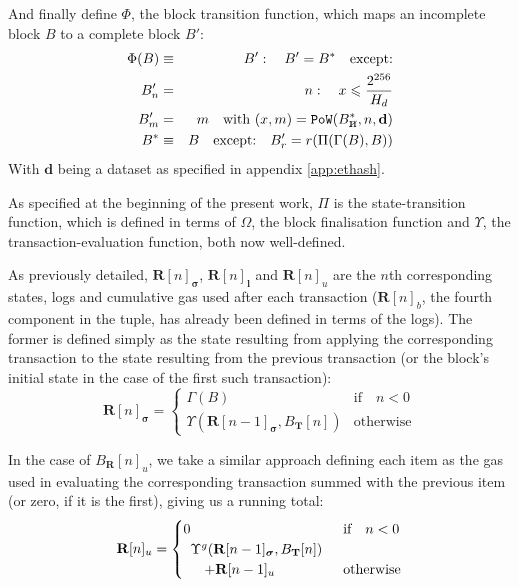 \documentclass[9pt,oneside]{amsart}
\newcommand{\hcancel}[1]{%
    \tikz[baseline=(tocancel.base)]{
        \node[inner sep=0pt,outer sep=0pt] (tocancel) {#1};
        \draw[black] (tocancel.south west) -- (tocancel.north east);
    }%
}%
\begin{document}
\begin{multicols}{2}
And finally define $\Phi$, the block transition function, which maps an incomplete block $B$ to a complete block $B'$:
\begin{eqnarray}
\Phi(B) & \equiv & B': \quad B' = B^* \quad \text{except:} \\
B'_n & = & n: \quad x \leqslant \frac{2^{256}}{H_d} \\
B'_m & = & m \quad \text{with } (x, m) = \mathtt{PoW}(B^*_{\hcancel{n}}, n, \mathbf{d}) \\
B^* & \equiv & B \quad \text{except:} \quad B'_r = r(\Pi(\Gamma(B), B))
\end{eqnarray}
With $\mathbf{d}$ being a dataset as specified in appendix \ref{app:ethash}.

As specified at the beginning of the present work, $\Pi$ is the state-transition function, which is defined in terms of $\Omega$, the block finalisation function and $\Upsilon$, the transaction-evaluation function, both now well-defined.

As previously detailed, $\mathbf{R}[n]_{\boldsymbol{\sigma}}$, $\mathbf{R}[n]_\mathbf{l}$ and $\mathbf{R}[n]_u$ are the $n$th corresponding states, logs and cumulative gas used after each transaction ($\mathbf{R}[n]_b$, the fourth component in the tuple, has already been defined in terms of the logs). The former is defined simply as the state resulting from applying the corresponding transaction to the state resulting from the previous transaction (or the block's initial state in the case of the first such transaction):
\begin{equation}
\mathbf{R}[n]_{\boldsymbol{\sigma}} = \begin{cases} \Gamma(B) & \text{if} \quad n < 0 \\ \Upsilon(\mathbf{R}[n - 1]_{\boldsymbol{\sigma}}, B_\mathbf{T}[n]) & \text{otherwise} \end{cases}
\end{equation}

In the case of $B_\mathbf{R}[n]_u$, we take a similar approach defining each item as the gas used in evaluating the corresponding transaction summed with the previous item (or zero, if it is the first), giving us a running total:
\begin{equation}
\mathbf{R}[n]_u = \begin{cases} 0 & \text{if} \quad n < 0 \\
\begin{array}[b]{l}
\Upsilon^g(\mathbf{R}[n - 1]_{\boldsymbol{\sigma}}, B_\mathbf{T}[n])\\ \quad + \mathbf{R}[n-1]_u
\end{array}
 & \text{otherwise} \end{cases}
\end{equation}


\end{multicols}
\end{document}
